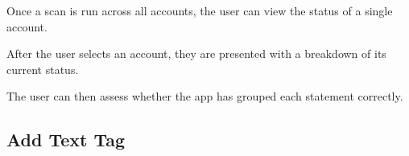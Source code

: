 \begin{minipage}{\textwidth}
  \centering
  \begin{minipage}[t]{4.6cm}
    \vspace{0pt}
    \centering
    \begin{minipage}{4.4cm}
      Once a scan is run across all accounts, the user can view the status of a single account.
    \end{minipage}
  \end{minipage}
  \begin{minipage}[t]{4.6cm}
    \vspace{0pt}
    \centering
    \begin{minipage}{4.4cm}
      After the user selects an account, they are presented with a breakdown of its current status.
    \end{minipage}
  \end{minipage}
  \begin{minipage}[t]{4.6cm}
    \vspace{0pt}
    \centering
    \begin{minipage}{4.4cm}
      The user can then assess whether the app has grouped each statement correctly.
    \end{minipage}
  \end{minipage}
\end{minipage}

\clearpage

\subsection{Add Text Tag}


